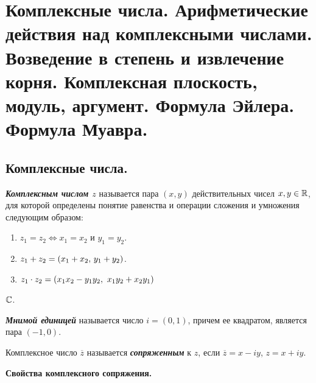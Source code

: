 \section{
    Комплексные числа. Арифметические действия над комплексными числами. Возведение в степень и извлечение корня. Комплексная плоскость, модуль, аргумент. Формула Эйлера. Формула Муавра.
}

\subsection{
    Комплексные числа.
}

\begin{definition}
    \textbf{\textit{Комплексным числом $z$}} называется пара $(x, y)$ действительных чисел $x, y \in \mathbb{R}$, для которой определены понятие равенства и операции сложения и умножения следующим образом:
    
    \begin{enumerate}[nosep]
        \item $z_1 = z_2 \iff x_1 = x_2$ и $y_1 = y_2$.
        \item $z_1 + z_2 = (x_1 + x_2, \thinspace y_1 + y_2)$.
        \item $z_1 \cdot z_2 = (x_1x_2 - y_1y_2, \thinspace \thinspace x_1y_2 + x_2y_1)$
    \end{enumerate}
\end{definition}

\begin{designation}
    $\mathbb{C}$.
\end{designation}

\begin{definition}
    \textbf{\textit{Мнимой единицей}} называется число $i = (0, 1)$, причем ее квадратом, является пара $(-1, 0)$.
\end{definition}

\begin{definition}
    Комплексное число $\overline{z}$ называется \textbf{\textit{сопряженным}} к $z$, если $\overline{z} = x - iy$, $z = x + iy$.
\end{definition}

\textbf{Свойства комплексного сопряжения.}

